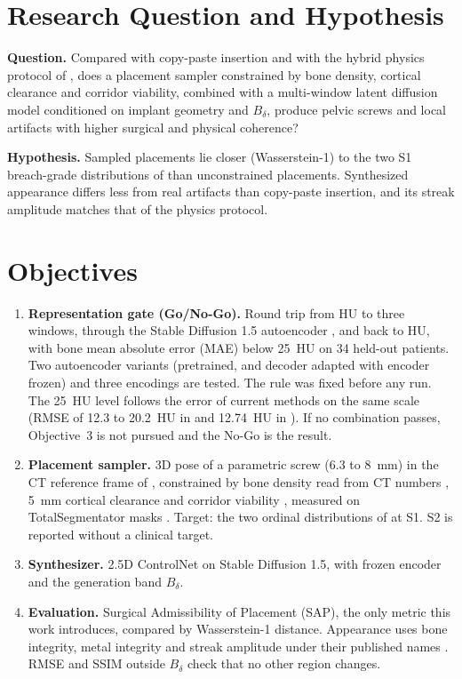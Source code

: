 \documentclass[9pt]{extarticle}
\begin{document}
\section{Research Question and Hypothesis}

\textbf{Question.} Compared with copy-paste insertion and with the hybrid physics protocol of \citet{peters2025hybrid}, does a placement sampler constrained by bone density, cortical clearance and corridor viability, combined with a multi-window latent diffusion model conditioned on implant geometry and $B_{\delta}$, produce pelvic screws and local artifacts with higher surgical and physical coherence?

\textbf{Hypothesis.} Sampled placements lie closer (Wasserstein-1) to the two S1 breach-grade distributions of \citet{zwingmann2009navigated} than unconstrained placements. Synthesized appearance differs less from real artifacts than copy-paste insertion, and its streak amplitude matches that of the physics protocol.

\section{Objectives}

\begin{enumerate}
  \item \textbf{Representation gate (Go/No-Go).} Round trip from HU to three windows, through the Stable Diffusion 1.5 autoencoder \citep{rombach2022latentdiffusion}, and back to HU, with bone mean absolute error (MAE) below 25~HU on 34 held-out patients. Two autoencoder variants (pretrained, and decoder adapted with encoder frozen) and three encodings are tested. The rule was fixed before any run. The 25~HU level follows the error of current methods on the same scale (RMSE of 12.3 to 20.2~HU in \citet{karageorgos2024ddpm} and 12.74~HU in \citet{yun2026simulationdriven}). If no combination passes, Objective~3 is not pursued and the No-Go is the result.
  \item \textbf{Placement sampler.} 3D pose of a parametric screw (6.3 to 8~mm) in the CT reference frame of \citet{kaiser2014dysmorphism}, constrained by bone density read from CT numbers \citep{arand2019pelvicring}, 5~mm cortical clearance and corridor viability \citep{mclaren2021corridor}, measured on TotalSegmentator masks \citep{wasserthal2023}. Target: the two ordinal distributions of \citet{zwingmann2009navigated} at S1. S2 is reported without a clinical target.
  \item \textbf{Synthesizer.} 2.5D ControlNet \citep{zhang2023controlnet} on Stable Diffusion 1.5, with frozen encoder and the generation band $B_{\delta}$.
  \item \textbf{Evaluation.} Surgical Admissibility of Placement (SAP), the only metric this work introduces, compared by Wasserstein-1 distance. Appearance uses bone integrity, metal integrity and streak amplitude under their published names \citep{peters2025hybrid}. RMSE and SSIM outside $B_{\delta}$ check that no other region changes.
\end{enumerate}
\end{document}
